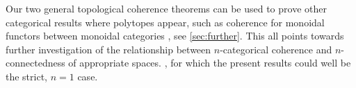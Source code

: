 Our two general topological coherence theorems can be used to prove other categorical results where polytopes appear, such as coherence for monoidal functors between monoidal categories \cite{epsteinFunctorsTensoredCategories1966}, see \cref{sec:further}.
This all points towards further investigation of the relationship between $n$-categorical coherence and $n$-connectedness of appropriate spaces.
, for which the present results could well be the strict, $n=1$ case.

